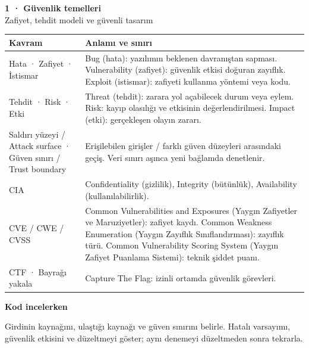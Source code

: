 \documentclass[11pt,a4paper]{article}
\newcommand{\AltBaslik}[1]{\par\vspace{3pt}\textbf{#1}\par\nobreak}
\begin{document}
{\Large\bfseries 1 · Güvenlik temelleri}\\[3pt]
{\normalsize Zafiyet, tehdit modeli ve güvenli tasarım}\\[5pt]
\begingroup\small\begin{tabularx}{\linewidth}{@{}LY@{}}\toprule
Kavram & Anlamı ve sınırı\\\midrule
Hata · Zafiyet · İstismar & Bug (hata): yazılımın beklenen davranıştan sapması. Vulnerability (zafiyet): güvenlik etkisi doğuran zayıflık. Exploit (istismar): zafiyeti kullanma yöntemi veya kodu.\\[2pt]
Tehdit · Risk · Etki & Threat (tehdit): zarara yol açabilecek durum veya eylem. Risk: kayıp olasılığı ve etkisinin değerlendirilmesi. Impact (etki): gerçekleşen olayın zararı.\\[2pt]
Saldırı yüzeyi / Attack surface · Güven sınırı / Trust boundary & Erişilebilen girişler / farklı güven düzeyleri arasındaki geçiş. Veri sınırı aşınca yeni bağlamda denetlenir.\\[2pt]
CIA & Confidentiality (gizlilik), Integrity (bütünlük), Availability (kullanılabilirlik).\\[2pt]
CVE / CWE / CVSS & Common Vulnerabilities and Exposures (Yaygın Zafiyetler ve Maruziyetler): zafiyet kaydı. Common Weakness Enumeration (Yaygın Zayıflık Sınıflandırması): zayıflık türü. Common Vulnerability Scoring System (Yaygın Zafiyet Puanlama Sistemi): teknik şiddet puanı.\\[2pt]
CTF · Bayrağı yakala & Capture The Flag: izinli ortamda güvenlik görevleri.\\[2pt]
\bottomrule\end{tabularx}\endgroup\par
\AltBaslik{Kod incelerken}
Girdinin kaynağını, ulaştığı kaynağı ve güven sınırını belirle. Hatalı varsayımı, güvenlik etkisini ve düzeltmeyi göster; aynı denemeyi düzeltmeden sonra tekrarla.
\end{document}
